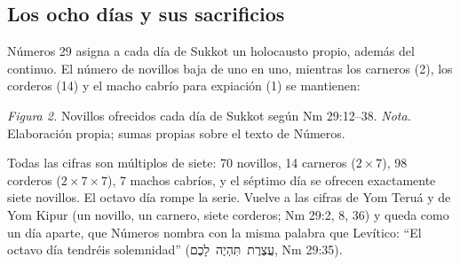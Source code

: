 \documentclass[11pt,letterpaper]{article}
\newcommand{\heb}[1]{\mbox{\foreignlanguage{hebrew}{#1}}}
\begin{document}
\subsection{Los ocho días y sus sacrificios}
Números 29 asigna a cada día de Sukkot un holocausto propio, además del continuo. El número de novillos baja de uno en uno, mientras los carneros (2), los corderos (14) y el macho cabrío para expiación (1) se mantienen:

\begin{center}
\par
{\footnotesize\color{sepia}\textit{Figura 2.} Novillos ofrecidos cada día de Sukkot según Nm 29:12--38. \textit{Nota.} Elaboración propia; sumas propias sobre el texto de Números.}
\end{center}

Todas las cifras son múltiplos de siete: 70 novillos, 14 carneros ($2 \times 7$), 98 corderos ($2 \times 7 \times 7$), 7 machos cabríos, y el séptimo día se ofrecen exactamente siete novillos. El octavo día rompe la serie. Vuelve a las cifras de Yom Teruá y de Yom Kipur (un novillo, un carnero, siete corderos; Nm 29:2, 8, 36) y queda como un día aparte, que Números nombra con la misma palabra que Levítico: ``El octavo día tendréis solemnidad'' (\heb{עֲצֶרֶת תִּהְיֶה לָכֶם}, Nm 29:35).
\end{document}
